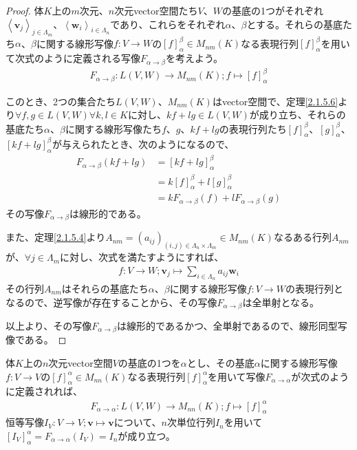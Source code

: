 \documentclass[dvipdfmx]{jsarticle}
\begin{document}
\begin{proof}
体$K$上の$m$次元、$n$次元vector空間たち$V$、$W$の基底の1つがそれぞれ$\left\langle \mathbf{v}_{j} \right\rangle_{j \in \varLambda_{m}}$、$\left\langle \mathbf{w}_{i} \right\rangle_{i \in \varLambda_{n}}$であり、これらをそれぞれ$\alpha$、$\beta$とする。それらの基底たち$\alpha$、$\beta$に関する線形写像$f:V \rightarrow W$の$[ f]^{\beta}_{\alpha} \in M_{nm}(K)$なる表現行列$[ f]^{\beta}_{\alpha}$を用いて次式のように定義される写像$F_{\alpha \rightarrow \beta}$を考えよう。
\begin{align*}
F_{\alpha \rightarrow \beta}:L(V,W) \rightarrow M_{nm}(K);f \mapsto [ f]^{\beta}_{\alpha}
\end{align*}\par
このとき、2つの集合たち$L(V,W)$、$M_{nm}(K)$はvector空間で、定理\ref{2.1.5.6}より$\forall f,g \in L(V,W)\forall k,l \in K$に対し、$kf + lg \in L(V,W)$が成り立ち、それらの基底たち$\alpha$、$\beta$に関する線形写像たち$f$、$g$、$kf + lg$の表現行列たち$[ f]^{\beta}_{\alpha}$、$[ g]^{\beta}_{\alpha}$、$[ kf + lg]^{\beta}_{\alpha}$が与えられたとき、次のようになるので、
\begin{align*}
F_{\alpha \rightarrow \beta}\left( kf + lg \right) &= \left[ kf + lg \right]^{\beta}_{\alpha}\\
&= k[ f]^{\beta}_{\alpha} + l[ g]^{\beta}_{\alpha}\\
&= kF_{\alpha \rightarrow \beta}(f) + lF_{\alpha \rightarrow \beta}(g)
\end{align*}
その写像$F_{\alpha \rightarrow \beta}$は線形的である。\par
また、定理\ref{2.1.5.4}より$A_{nm} = \left( a_{ij} \right)_{(i,j) \in \varLambda_{n} \times \varLambda_{m}} \in M_{nm}(K)$なるある行列$A_{nm}$が、$\forall j \in \varLambda_{m}$に対し、次式を満たすようにすれば、
\begin{align*}
f:V \rightarrow W;\mathbf{v}_{j} \mapsto \sum_{i \in \varLambda_{n}} {a_{ij}\mathbf{w}_{i}}
\end{align*}
その行列$A_{nm}$はそれらの基底たち$\alpha$、$\beta$に関する線形写像$f:V \rightarrow W$の表現行列となるので、逆写像が存在することから、その写像$F_{\alpha \rightarrow \beta}$は全単射となる。\par
以上より、その写像$F_{\alpha \rightarrow \beta}$は線形的であるかつ、全単射であるので、線形同型写像である。
\end{proof}
\begin{thm}
\label{2.1.5.15}
体$K$上の$n$次元vector空間$V$の基底の1つを$\alpha$とし、その基底$\alpha$に関する線形写像$f:V \rightarrow V$の$[ f]_{\alpha}^{\alpha} \in M_{nn}(K)$なる表現行列$[ f]_{\alpha}^{\alpha}$を用いて写像$F_{\alpha \rightarrow \alpha}$が次式のように定義されれば、
\begin{align*}
F_{\alpha \rightarrow \alpha}:L(V,W) \rightarrow M_{nn}(K);f \mapsto [ f]_{\alpha}^{\alpha}
\end{align*}
恒等写像$I_{V}:V \rightarrow V;\mathbf{v} \mapsto \mathbf{v}$について、$n$次単位行列$I_{n}$を用いて$\left[ I_{V} \right]_{\alpha}^{\alpha} = F_{\alpha \rightarrow \alpha}\left( I_{V} \right) = I_{n}$が成り立つ。
\end{thm}
\end{document}
